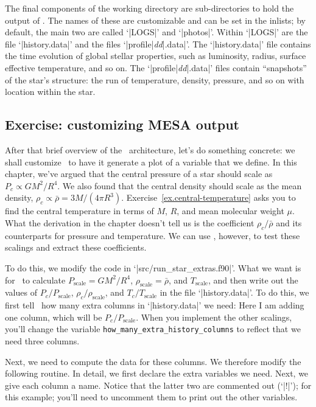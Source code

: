 The final components of the working directory are sub-directories to hold the output of \mesa.  The names of these are customizable and can be set in the inlists; by default, the main two are called `|LOGS|' and `|photos|'.  Within `|LOGS|' are the file `|history.data|' and the files `|profile|\textit{dd}|.data|'. The `|history.data|' file contains the time evolution of global stellar properties, such as luminosity, radius, surface effective temperature, and so on. The `|profile|\textit{dd}|.data|' files contain ``snapshots'' of the star's structure: the run of temperature, density, pressure, and so on with location within the star. 

\subsection{Exercise: customizing MESA output}

After that brief overview of the \mesa\ architecture, let's do something concrete: we shall customize \mesa\ to have it generate a plot of a variable that we define.  In this chapter, we've argued that the central pressure of a star should scale as $P_{c}\propto GM^{2}/R^{4}$. We also found that the central density should scale as the mean density, $\rho_{c}\propto \bar{\rho} = 3M/(4\pi R^{3})$. Exercise~\ref{ex.central-temperature} asks you to find the central temperature in terms of $M$, $R$, and mean molecular weight $\mu$. What the derivation in the chapter doesn't tell us is the coefficient $\rho_{c}/\bar{\rho}$ and its counterparts for pressure and temperature.  We can use \mesa, however, to test these scalings and extract these coefficients.

To do this, we modify the code in `|src/run_star_extras.f90|'.  What we want is for \mesa\ to calculate $P_{\mathrm{scale}} = GM^{2}/R^{4}$, $\rho_{\mathrm{scale}} = \bar{\rho}$, and $T_{\mathrm{scale}}$, and then write out the values of $P_{c}/P_{\mathrm{scale}}$, $\rho_{c}/\rho_{\mathrm{scale}}$, and $T_{c}/T_{\mathrm{scale}}$ in the file `|history.data|'. To do this, we first tell \mesa\ how many extra columns in `|history.data|' we need:
Here I am adding one column, which will be $P_{c}/P_{\mathrm{scale}}$.  When you implement the other scalings, you'll change the variable \verb|how_many_extra_history_columns| to reflect that we need three columns.

Next, we need to compute the data for these columns.  We therefore modify the following routine.
In detail, we first declare the extra variables we need.
Next, we give each column a name.
Notice that the latter two are commented out (`|!|'); for this example; you'll need to uncomment them to print out the other variables.

